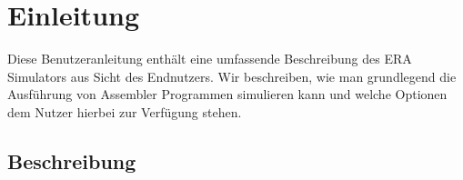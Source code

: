 
\section{Einleitung}

Diese Benutzeranleitung enthält eine umfassende Beschreibung des ERA Simulators aus Sicht des Endnutzers. Wir beschreiben, wie man grundlegend die Ausführung von Assembler Programmen simulieren kann und welche Optionen dem Nutzer hierbei zur Verfügung stehen.

\subsection{Beschreibung}

